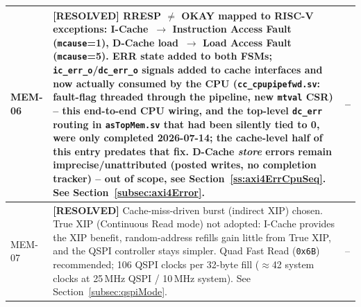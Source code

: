 \begin{table}[H]
\begin{tabularx}{\textwidth}{|l |X |l|}
  \hline
  MEM-06 & \textbf{[RESOLVED]} RRESP $\neq$ OKAY mapped to RISC-V exceptions:
           I-Cache~$\rightarrow$ Instruction Access Fault (\texttt{mcause}=1),
           D-Cache load~$\rightarrow$ Load Access Fault (\texttt{mcause}=5).
           ERR state added to both FSMs; \texttt{ic\_err\_o}/\texttt{dc\_err\_o}
           signals added to cache interfaces \textbf{and now actually
           consumed by the CPU} (\texttt{cc\_cpupipefwd.sv}: fault-flag
           threaded through the pipeline, new \texttt{mtval} CSR) -- this
           end-to-end CPU wiring, and the top-level \texttt{dc\_err} routing
           in \texttt{asTopMem.sv} that had been silently tied to 0, were
           only completed 2026-07-14; the cache-level half of this entry
           predates that fix. D-Cache \textit{store} errors remain
           imprecise/unattributed (posted writes, no completion tracker) --
           out of scope, see Section~\ref{ss:axi4ErrCpuSeq}.
           See Section~\ref{subsec:axi4Error}. & -- \\
  \hline
  MEM-07 & \textbf{[RESOLVED]} Cache-miss-driven burst (indirect XIP) chosen.
           True XIP (Continuous Read mode) not adopted: I-Cache provides
           the XIP benefit, random-address refills gain little from True XIP,
           and the QSPI controller stays simpler.
           Quad Fast Read (\texttt{0x6B}) recommended; 106 QSPI clocks per
           32-byte fill ($\approx$42 system clocks at 25\,MHz QSPI / 10\,MHz system).
           See Section~\ref{subsec:qspiMode}. & -- \\
  \hline
\end{tabularx}
\end{table}
